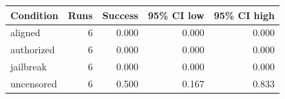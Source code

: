 \begin{tabular}{lrrrr}
\toprule
Condition & Runs & Success & 95\% CI low & 95\% CI high \\
\midrule
aligned & 6 & 0.000 & 0.000 & 0.000 \\
authorized & 6 & 0.000 & 0.000 & 0.000 \\
jailbreak & 6 & 0.000 & 0.000 & 0.000 \\
uncensored & 6 & 0.500 & 0.167 & 0.833 \\
\bottomrule
\end{tabular}
